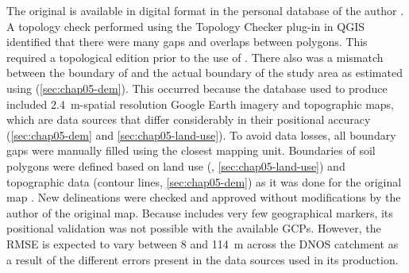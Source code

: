 

The original \soilNew{} is available in digital format in the personal database of the author 
\cite{Miguel2010}. A topology check performed using the Topology Checker plug-in in QGIS identified that 
there were many gaps and overlaps between polygons. This required a topological edition prior to the use of 
\soilNew. There also was a mismatch between the boundary of \soilNew{} and the actual boundary of the study 
area as estimated using \demNew{} (\autoref{sec:chap05-dem}). This occurred because the database used to 
produce \soilNew{} included \SI{2.4}{\m}-spatial resolution Google Earth\rr{} imagery and topographic maps, 
which are data sources that differ considerably in their positional accuracy (\autoref{sec:chap05-dem} and 
\autoref{sec:chap05-land-use}). To avoid data losses, all boundary gaps were manually filled using the closest 
mapping unit. Boundaries of soil polygons were defined based on land use (\landNew{}, 
\autoref{sec:chap05-land-use}) and topographic data (contour lines, \autoref{sec:chap05-dem}) as it was done 
for the original map \cite{Miguel2010}. New delineations were checked and approved without modifications by 
the author of the original map. Because \soilNew{} includes very few geographical markers, its positional 
validation was not possible with the available GCPs. However, the RMSE is expected to vary between 
8 and \SI{114}{\m} across the DNOS catchment as a result of the different errors present in the data sources 
used in its production.

